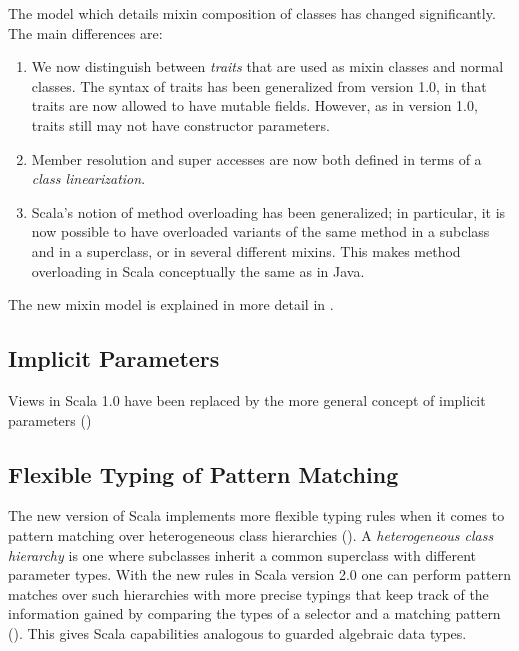 The model which details mixin composition of classes has changed
significantly. The main differences are:
\begin{enumerate}
\item
We now distinguish between {\em traits} that are used as mixin classes
and normal classes. The syntax of traits has been generalized from
version 1.0, in that traits are now allowed to have mutable
fields. However, as in version 1.0, traits still may not have
constructor parameters.
\item
Member resolution and super accesses are now both defined in terms of
a {\em class linearization}. 
\item
Scala's notion of method overloading has been generalized; in
 particular, it is now possible to have overloaded variants of the
 same method in a subclass and in a superclass, or in several different
 mixins. This makes method overloading in Scala conceptually the
 same as in Java.
\end{enumerate}
The new mixin model is explained in more detail in
.

\subsection*{Implicit Parameters}

Views in Scala 1.0 have been replaced by the more general concept of
implicit parameters ()

\subsection*{Flexible Typing of Pattern Matching}

The new version of Scala implements more flexible typing rules when it
comes to pattern matching over heterogeneous class hierarchies
(). A {\em heterogeneous class hierarchy} is
one where subclasses inherit a common superclass with different
parameter types.  With the new rules in Scala version 2.0 one can
perform pattern matches over such hierarchies with more precise
typings that keep track of the information gained by comparing the
types of a selector and a matching pattern ().
This gives Scala capabilities analogous to guarded algebraic data types.



